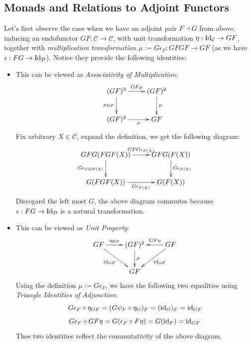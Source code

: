 \documentclass{article}
\begin{document}
\newpage

\subsection{Monads and Relations to Adjoint Functors}

Let's first observe the case when we have an adjoint pair $F\dashv G$ from above, inducing an endofunctor $GF:\mathcal{C}\rightarrow\mathcal{C}$, with unit transformation $\eta:\mathrm{Id}_\mathcal{C}\rightarrow GF$, together with \emph{multiplication transformation} $\mu:=G\epsilon_F:GFGF\rightarrow GF$ (as we have $\epsilon:FG\rightarrow\mathrm{Id}_\mathcal{D}$). Notice they provide the following identities:
\begin{itemize}
    \item This can be viewed as \emph{Associativity of Multiplication}:
    \[\xymatrix{
        (GF)^3 \ar[d]_-{\mu_{GF}} \ar[r]^-{GF\mu} & (GF)^2\ar[d]^-{\mu}\\
        (GF)^2 \ar[r]_-{\mu} & GF
    }\]
    Fix arbitrary $X\in\mathcal{C}$, expand the definition, we get the following diagram:
    \[\xymatrix{
        GFG(FGF(X)) \ar[d]_-{G\epsilon_{FGF(X)}} \ar[r]^-{GFG\epsilon_{F(X)}} & GFG(F(X)) \ar[d]^-{G\epsilon_{F(X)}}\\
        G(FGF(X)) \ar[r]_-{G\epsilon_{F(X)}} & G(F(X))
    }\]
    Disregard the left most $G$, the above diagram commutes because $\epsilon:FG\rightarrow\mathrm{Id}_\mathcal{D}$ is a natural transformation.

    \item This can be viewed as \emph{Unit Property}:
    \[\xymatrix{
        GF \ar[dr]_-{\id_{GF}} \ar[r]^-{\eta_{GF}} & (GF)^2 \ar[d]^-{\mu} & GF \ar[l]_-{GF\eta} \ar[dl]^-{\id_{GF}}\\
        & GF
    }\]
    Using the definition $\mu:= G\epsilon_F$, we have the following two equalities using \emph{Triangle Identities of Adjunction}:
    \[G\epsilon_F \circ \eta_{GF} = (G\psi_F\circ \eta_G)_F = (\mathrm{id}_G)_F = \mathrm{id}_{GF}\]
    \[G\epsilon_F\circ GF\eta = G(\epsilon_F \circ F\eta) = G(\mathrm{id}_F) = \mathrm{id}_{GF} \]
    Thse two identities reflect the commutativity of the above diagram.
\end{itemize}
\end{document}
